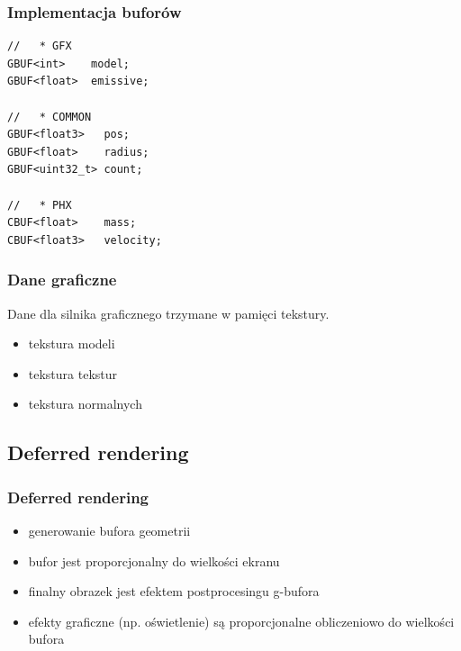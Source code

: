 \documentclass{beamer}
\begin{document}
\begin{frame}[fragile]
\frametitle{Implementacja buforów}
\begin{verbatim}
//   * GFX
GBUF<int>    model;
GBUF<float>  emissive;

//   * COMMON
GBUF<float3>   pos;
GBUF<float>    radius;
GBUF<uint32_t> count;

//   * PHX
CBUF<float>    mass;
CBUF<float3>   velocity;
\end{verbatim}
\end{frame}

\frame
{
	\frametitle{Dane graficzne}

	Dane dla silnika graficznego trzymane w pamięci tekstury.
		\begin{itemize}
	\item tekstura modeli
		\item tekstura tekstur
		\item tekstura normalnych
		\end{itemize}
}

\subsection{Deferred rendering}\label{sub:deferred rendering}

\frame
{
	\frametitle{Deferred rendering}

	\begin{itemize}
	\item generowanie bufora geometrii
		\item bufor jest proporcjonalny do wielkości ekranu
		\item finalny obrazek jest efektem postprocesingu g-bufora
		\item efekty graficzne (np. oświetlenie) są proporcjonalne obliczeniowo do wielkości bufora
		\end{itemize}
}
\end{document}
